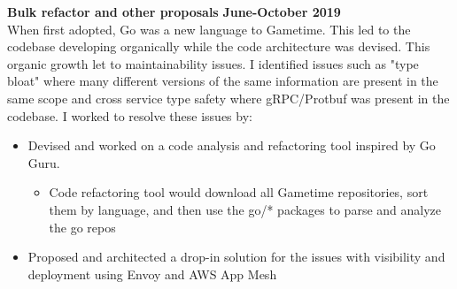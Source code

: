 \documentclass[overlapped]{res}
\begin{document}
\begin{resume}
\begin{itemize}[leftmargin=0in]
        \textbf{Bulk refactor and other proposals} \hfill \textbf{June-October 2019} \\
        When first adopted, Go was a new language to Gametime. This led to the codebase developing organically 
        while the code architecture was devised. This organic growth let to maintainability issues. I identified 
        issues such as "type bloat" where many different versions of the same information are present in the same 
        scope and cross service type safety where gRPC/Protbuf was present in the codebase. I worked to resolve these issues by:
        \begin{itemize}
            \item[\textbullet] Devised and worked on a code analysis and refactoring tool inspired by Go Guru.
            \begin{itemize}
              \item[\textbullet] Code refactoring tool would download all Gametime repositories, sort them by language, and then use the go/* packages to parse and analyze the go repos
            \end{itemize}
            \item[\textbullet] Proposed and architected a drop-in solution for the issues with visibility and deployment using Envoy and AWS App Mesh
        \end{itemize}
        \vspace{0.125in}
\end{itemize}
\vspace{0.25in}


\end{resume}
\end{document}
